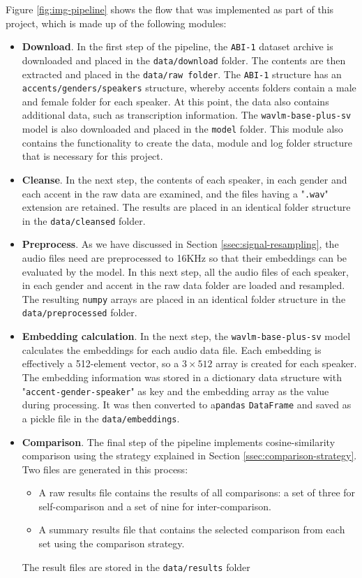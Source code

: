 \documentclass[conference]{IEEEtran}
\begin{document}
Figure \ref{fig:img-pipeline} shows the flow that was implemented as part of this project, which is made up of the following modules:
\begin{itemize}
	\item \textbf{Download}. In the first step of the pipeline, the \texttt{ABI-1} dataset archive is downloaded and placed in the \texttt{data/download} folder. The contents are then extracted and placed in the \texttt{data/raw folder}. The \texttt{ABI-1} structure has an \texttt{accents/genders/speakers} structure, whereby accents folders contain a male and female folder for each speaker. At this point, the data also contains additional data, such as transcription information.
	The \texttt{wavlm-base-plus-sv} model is also downloaded and placed in the \texttt{model} folder.
	This module also contains the functionality to create the data, module and log folder structure that is necessary for this project.
	
	\item \textbf{Cleanse}. In the next step, the contents of each speaker, in each gender and each accent in the raw data are examined, and the files having a "\texttt{.wav}" extension are retained. The results are placed in an identical folder structure in the \texttt{data/cleansed} folder.
	
	\item \textbf{Preprocess}. As we have discussed in Section \ref{ssec:signal-resampling}, the audio files need are preprocessed to 16KHz so that their embeddings can be evaluated by the model. In this next step, all the audio files of each speaker, in each gender and accent in the raw data folder are loaded and resampled. The resulting \texttt{numpy} arrays are placed in an identical folder structure in the \texttt{data/preprocessed} folder.
	
	\item \textbf{Embedding calculation}. In the next step, the \texttt{wavlm-base-plus-sv} model calculates the embeddings for each audio data file. Each embedding is effectively a 512-element vector, so a $3 \times 512$ array is created for each speaker. The embedding information was stored in a dictionary data structure with "\texttt{accent-gender-speaker}" as key and the embedding array as the value during processing. It was then converted to a\texttt{pandas} \texttt{DataFrame} and saved as a pickle file in the \texttt{data/embeddings}.
	
	\item \textbf{Comparison}. The final step of the pipeline implements cosine-similarity comparison using the strategy explained in Section \ref{ssec:comparison-strategy}. Two files are generated in this process:
	\begin{itemize}
		\item A raw results file contains the results of all comparisons: a set of three for self-comparison and a set of nine for inter-comparison.
		\item A summary results file that contains the selected comparison from each set using the comparison strategy.
	\end{itemize}
	The result files are stored in the \texttt{data/results} folder
\end{itemize}
\end{document}
